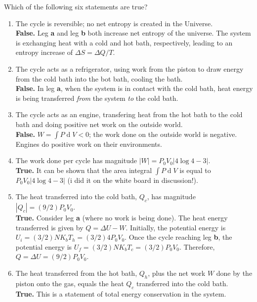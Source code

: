 \documentclass{article}
\renewcommand{\d}[1]{\ensuremath{\operatorname{d}\!{#1}}}
\newenvironment{question}[0]{
\vspace{2mm}
\noindent
\itshape
}
\numberwithin{equation}{section}
\begin{document}
\begin{question}
Which of the following six statements are true?
\end{question}

\begin{enumerate}[(1)]
	\item The cycle is reversible; no net entropy is created in the Universe.
	\\
	\textbf{False.} Leg \textbf{a} and leg \textbf{b} both increase net entropy of the universe. The system is exchanging heat with a cold and hot bath, respectively, leading to an entropy increase of $\Delta S = \Delta Q/T$.

	\item The cycle acts as a refrigerator, using work from the piston to draw energy from the cold bath into the bot bath, cooling the bath.
	\\
	\textbf{False.} In leg \textbf{a}, when the system is in contact with the cold bath, heat energy is being transferred \textit{from} the system \textit{to} the cold bath.

	\item The cycle acts as an engine, transfering heat from the hot bath to the cold bath and doing positive net work on the outside world.
	\\
	\textbf{False.} $W = \int P \d{V} < 0$; the work done on the outside world is negative. Engines do positive work on their environments.

	\item The work done per cycle has magnitude
			$|W| = P_0V_0 |4\log{4-3}|$.
	\\
	\textbf{True.} It can be shown that the area integral $\int P \d{V}$ is equal to 	$P_0V_0 |4\log{4-3}|$ (i did it on the white board in discussion!).
	\item The heat transferred into the cold bath, $Q_c$, has magnitude	$|Q_c| = (9/2)P_0V_0$.
	\\
	\textbf{True.} Consider leg \textbf{a} (where no work is being done). The heat energy transferred is given by $Q = \Delta U - W$. Initially, the potential energy is $U_i = (3/2)NK_bT_h = (3/2)4P_0V_0$. Once the cycle reaching leg \textbf{b}, the potential energy is $U_f = (3/2)NK_bT_c = (3/2)P_0V_0$. Therefore, $Q = \Delta U = (9/2)P_0V_0$.

	\item The heat transferred from the hot bath, $Q_h$, plus the net work $W$ done by the piston onto the gas, equals the heat $Q_c$ transferred into the cold bath.
	\\
	\textbf{True.} This is a statement of total energy conservation in the system.
\end{enumerate}
\end{document}
